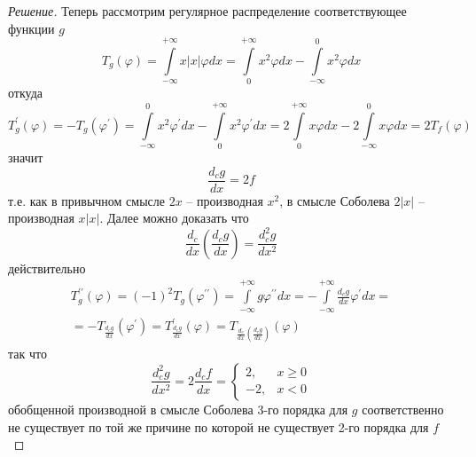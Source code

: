 \documentclass[12pt,a4paper]{article}
\theoremstyle{definition}
\newenvironment{solution}
{\renewcommand\qedsymbol{$\blacksquare$}\begin{proof}[Решение]}
{\end{proof}}
\begin{document}
\begin{solution}
	Теперь рассмотрим регулярное распределение соответствующее функции $g$
	\begin{equation*}
		T_g (\varphi) = \int\limits_{-\infty}^{+\infty} {x |x| \varphi dx} = \int\limits_{0}^{+\infty}{x^2 \varphi dx} - \int\limits_{-\infty}^{0}{x^2 \varphi dx}
	\end{equation*}
	откуда
	\begin{equation*}
		T^\prime_g (\varphi) = -T_g (\varphi^\prime) = \int\limits_{-\infty}^{0}{x^2 \varphi^\prime dx} - \int\limits_{0}^{+\infty}{x^2 \varphi^\prime dx} = 2 \int\limits_{0}^{+\infty}{x \varphi dx} - 2 \int\limits_{-\infty}^{0}{x\varphi dx} = 2 T_f (\varphi) 
	\end{equation*}
	значит 
	\begin{equation*}
		\frac{d_c g}{dx} = 2f
	\end{equation*}
	т.е. как в привычном смысле $2x$ -- производная $x^2$, в смысле Соболева $2|x|$ -- производная $x|x|$. 
	Далее можно доказать что
	\begin{equation*}
		\frac{d_c}{dx} \left(\frac{d_c g}{dx}\right) = \frac{d_c^2 g}{dx^2}
	\end{equation*}
	действительно
	\begin{multline*}
		T^{\prime\prime}_g (\varphi) = (-1)^2 T_g (\varphi^{\prime\prime} ) = \int\limits_{-\infty}^{+\infty}{g \varphi^{\prime\prime} dx} = -\int\limits_{-\infty}^{+\infty}{\frac{d_c g}{dx} \varphi^\prime dx} = \\ = -T_{\frac{d_c g}{dx}} (\varphi^\prime) = T^\prime_{\frac{d_c g}{dx}} (\varphi) = T_{\frac{d_c}{dx} \left(\frac{d_c g}{dx}\right)} (\varphi)
	\end{multline*}
	так что 
	\begin{equation*}
		\frac{d_c^2 g}{dx^2} = 2 \frac{d_c f}{dx} = 
		\begin{cases}
			2, &x \geq 0 \\
			-2, &x < 0
		\end{cases}
	\end{equation*}
	обобщенной производной в смысле Соболева 3-го порядка для $g$ соответственно не существует по той же причине по которой не существует 2-го порядка для $f$
\end{solution}

\newpage
	
\end{document}
